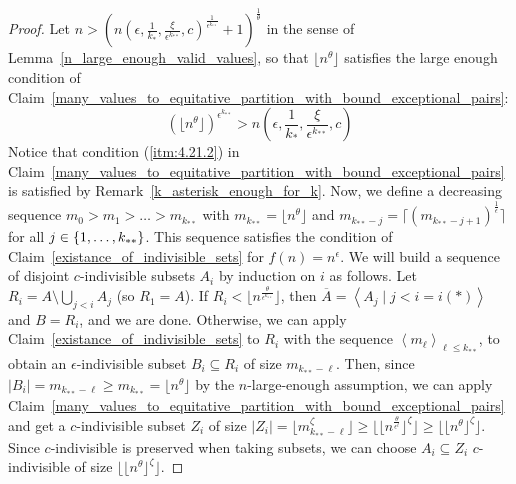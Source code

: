         \begin{proof}
            Let $n > \left( n\left( \epsilon, \frac{1}{k_*}, \frac{\xi}{\epsilon^{k_{**}}}, c \right)^{\frac{1}{\epsilon^{k_{**}}}} + 1 \right)^{\frac{1}{\theta}}$
            in the sense of Lemma~\ref{n_large_enough_valid_values}, so that $\lfloor n^\theta \rfloor$ satisfies the
            large enough condition of Claim~\ref{many_values_to_equitative_partition_with_bound_exceptional_pairs}:
            \[
                \left( \lfloor n^\theta \rfloor \right)^{\epsilon^{k_{**}}}
                    > n\left( \epsilon, \frac{1}{k_*}, \frac{\xi}{\epsilon^{k_{**}}}, c \right)
            \]
            Notice that condition (\ref{itm:4.21.2}) in Claim~\ref{many_values_to_equitative_partition_with_bound_exceptional_pairs}
            is satisfied by Remark~\ref{k_asterisk_enough_for_k}.
            Now, we define a decreasing sequence $m_0 > m_1 > \dots > m_{k_{**}}$ with $m_{k_{**}} = \lfloor n^\theta \rfloor$
            and $m_{k_{**}-j} = \lceil \left( m_{k_{**}-j+1} \right)^{\frac{1}{\epsilon}} \rceil$ for all $j \in \left\{ 1, \dots, k_{**} \right\}$.
            This sequence satisfies the condition of Claim~\ref{existance_of_indivisible_sets} for $f(n) = n^\epsilon$.
            We will build a sequence of disjoint $c$-indivisible subsets $A_i$ by induction on $i$ as follows.
            Let $R_i = A \setminus \bigcup_{j<i} A_j$ (so $R_1 = A$).
            If $R_i < \lfloor n^{\frac{\theta}{\epsilon^{k_{**}}}} \rfloor$, then
            $\overline{A} = \left< A_j \mid j < i = i(*) \right>$ and $B = R_i$, and we are done.
            Otherwise, we can apply Claim~\ref{existance_of_indivisible_sets} to $R_i$ with the sequence
            $\left< m_\ell \right>_{\ell \leq k_{**}}$, to obtain an $\epsilon$-indivisible subset $B_i \subseteq R_i$ of
            size $m_{k_{**}-\ell}$.
            Then, since $|B_i| = m_{k_{**}-\ell} \geq m_{k_{**}} = \lfloor n^\theta \rfloor$ by the $n$-large-enough assumption,
            we can apply Claim~\ref{many_values_to_equitative_partition_with_bound_exceptional_pairs} and get a
            $c$-indivisible subset $Z_i$ of size $|Z_i| = \lfloor m_{k_{**}-\ell}^\zeta \rfloor
            \geq \lfloor \lfloor n^{\frac{\theta}{\epsilon^\ell}} \rfloor ^\zeta \rfloor
            \geq \lfloor \lfloor n^{\theta} \rfloor ^\zeta \rfloor$.
            Since $c$-indivisible is preserved when taking subsets, %
            we can choose $A_i \subseteq Z_i$ $c$-indivisible of size $\lfloor \lfloor n^{\theta} \rfloor ^\zeta \rfloor$.
        \end{proof}

